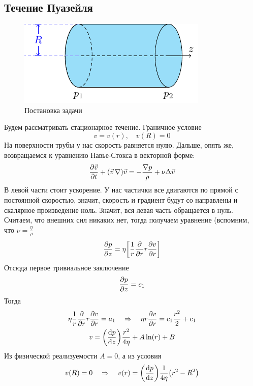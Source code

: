 \subsection{Течение Пуазейля}
\begin{figure}[h!]
    \centering
    \includegraphics[scale=1.5]{img/puaz}
    \caption{Постановка задачи}
    \label{fig:figure1}
\end{figure}
Будем рассматривать стационарное течение. Граничное условие
\begin{equation}
    v = v(r), \quad v(R) = 0
\end{equation}
На поверхности трубы у нас скорость равняется нулю. Дальше, 
опять же, возвращаемся к уравнению Навье-Стокса в векторной форме:
\begin{equation}
    \pdv{\vec{v}}{t}+(\vec{v}\,\nabla)\vec{v} = 
    - \frac{\nabla p}{\rho}+\nu \Delta \vec{v}
\end{equation}
В левой части стоит ускорение. У нас частички все двигаются по прямой с постоянной скоростью, значит, скорость и градиент будут со направлены и скалярное произведение ноль. Значит, вся левая часть обращается в нуль. Считаем, что внешних сил никаких нет, тогда получаем уравнение (вспомним, что $\nu = \frac{\eta}{\rho}$
\begin{equation}
    \pdv{p}{z} = \eta 
   \qty[
   \frac{1}{r} \pdv{r} r \pdv{v}{r}
   ]
\end{equation}
Отсюда первое тривиальное заключение
\begin{equation}
    \pdv{p}{z} = c_1
\end{equation}
Тогда
\begin{gather}
    \eta\frac{1}{r} \pdv{r} r \pdv{v}{r} = a_1
    \quad \Rightarrow \quad
    \eta r\pdv{v}{r} = c_1 \frac{r^2}{2} + c_{1}\\
    v = \qty(\dv{p}{z}) \frac{r^2}{4\eta}+A \ln(r) + B
\end{gather}
Из физической реализуемости $A = 0$, а из условия
\begin{equation}
    v(R) = 0 \quad \Rightarrow \quad
    v(r) = \qty(\dv{p}{z}) \frac{1}{4\eta}\qty(r^2-R^2)
\end{equation}

